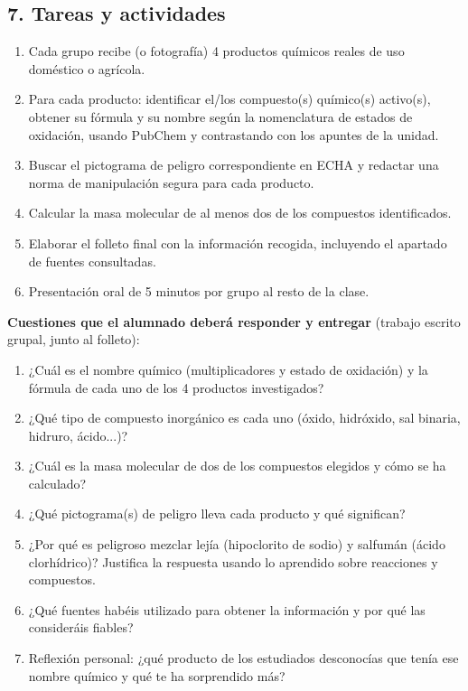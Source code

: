 \documentclass[11pt,a4paper]{article}
\begin{document}
\subsection*{7. Tareas y actividades}
\begin{enumerate}
    \item Cada grupo recibe (o fotografía) 4 productos químicos reales de uso doméstico o agrícola.
    \item Para cada producto: identificar el/los compuesto(s) químico(s) activo(s), obtener su fórmula y su nombre según la nomenclatura de estados de oxidación, usando PubChem y contrastando con los apuntes de la unidad.
    \item Buscar el pictograma de peligro correspondiente en ECHA y redactar una norma de manipulación segura para cada producto.
    \item Calcular la masa molecular de al menos dos de los compuestos identificados.
    \item Elaborar el folleto final con la información recogida, incluyendo el apartado de fuentes consultadas.
    \item Presentación oral de 5 minutos por grupo al resto de la clase.
\end{enumerate}
\textbf{Cuestiones que el alumnado deberá responder y entregar} (trabajo escrito grupal, junto al folleto):
\begin{enumerate}
    \item ¿Cuál es el nombre químico (multiplicadores y estado de oxidación) y la fórmula de cada uno de los 4 productos investigados?
    \item ¿Qué tipo de compuesto inorgánico es cada uno (óxido, hidróxido, sal binaria, hidruro, ácido...)?
    \item ¿Cuál es la masa molecular de dos de los compuestos elegidos y cómo se ha calculado?
    \item ¿Qué pictograma(s) de peligro lleva cada producto y qué significan?
    \item ¿Por qué es peligroso mezclar lejía (hipoclorito de sodio) y salfumán (ácido clorhídrico)? Justifica la respuesta usando lo aprendido sobre reacciones y compuestos.
    \item ¿Qué fuentes habéis utilizado para obtener la información y por qué las consideráis fiables?
    \item Reflexión personal: ¿qué producto de los estudiados desconocías que tenía ese nombre químico y qué te ha sorprendido más?
\end{enumerate}
\end{document}
